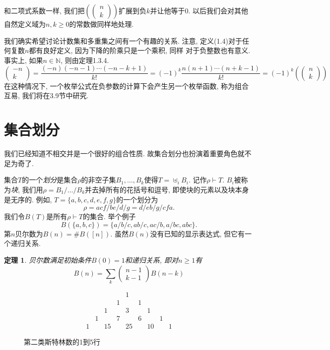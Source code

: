 \documentclass{ctexbook}
\newtheorem{thm}{定理}[section]
\begin{document}
和二项式系数一样, 我们把$\left(\left(\begin{array}{l}n \\ k\end{array}\right)\right)$扩展到负$k$并让他等于0.
以后我们会对其他自然定义域为$n, k \geqslant 0$的常数做同样地处理.

我们确实希望讨论计数集和多重集之间有一个有趣的关系. 注意, 定义(1.4)对于任何复数$n$都有良好定义, 因为下降的阶乘只是一个乘积, 同样
对于负整数也有意义. 事实上, 如果$n \in \mathbb{N}$, 则由定理1.3.4.
\begin{equation}
\left(\begin{array}{c}
-n \\ k
\end{array}\right)=\frac{(-n)(-n-1) \cdots(-n-k+1)}{k !}=(-1)^{k} \frac{n(n+1) \cdots(n+k-1)}{k !}=(-1)^{k}\left(\left(\begin{array}{l}
n \\ k
\end{array}\right)\right)
\end{equation}
在这种情况下, 一个枚举公式在负参数的计算下会产生另一个枚举函数, 称为组合互易, 我们将在3.9节中研究.

\section{集合划分}
我们已经知道不相交并是一个很好的组合性质. 故集合划分也扮演着重要角色就不足为奇了.

集合$T$的一个\textsl{划分}是集合$\rho$的非空子集$B_{1}, \ldots, B_{k}$使得$T=\uplus_{i} B_{i}$. 记作$\rho \vdash T$.
$B_{i}$被称为\textsl{块}, 我们用$\rho=B_{1} / \ldots / B_{k}$并去掉所有的花括号和逗号, 即使块的元素以及块本身是无序的.
例如, $T=\{a, b, c, d, e, f, g\}$的一个划分为
$$
\rho=a c f / b e / d / g=d / e b / g / c f a .
$$
我们令$B(T)$是所有$\rho \vdash T$的集合. 举个例子
$$
B(\{a, b, c\})=\{a / b / c, a b / c, a c / b, a / b c, a b c\}.
$$
第$n$贝尔数为$B(n)=\# B([n])$. 虽然$B(n)$没有已知的显示表达式, 但它有一个递归关系.
    \begin{thm}
    	贝尔数满足初始条件$B(0)=1$和递归关系, 即对$n \geqslant 1$有
    	$$
    	B(n)=\sum_{k}\left(\begin{array}{l}
    	n-1 \\ k-1
    	\end{array}\right) B(n-k)
    	$$
    \end{thm}

\begin{figure}
    \centering
$$\begin{array}{ccccccccccccc}
    & & & & 1 & & & & \\
    & & & 1 & & 1 & & & \\
    & & 1 & & 3 & & 1 & & \\
    & 1 & & 7 & & 6 & & 1 & \\
    1 & & 15 & & 25 & & 10 & & 1
\end{array}$$
    \caption{ 第二类斯特林数的1到5行}
\end{figure}
\end{document}
